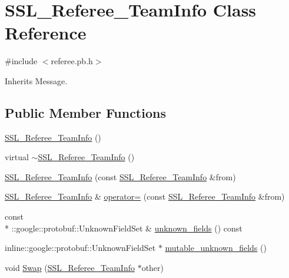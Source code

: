 \hypertarget{class_s_s_l___referee___team_info}{\section{S\-S\-L\-\_\-\-Referee\-\_\-\-Team\-Info Class Reference}
\label{class_s_s_l___referee___team_info}
}


{\ttfamily \#include $<$referee.\-pb.\-h$>$}



Inherits Message.

\subsection*{Public Member Functions}
\begin{DoxyCompactItemize}
\item 
\hyperlink{class_s_s_l___referee___team_info_a0565dabde6097b6615778a794f0bf9dc}{S\-S\-L\-\_\-\-Referee\-\_\-\-Team\-Info} ()
\item 
virtual \hyperlink{class_s_s_l___referee___team_info_aeba1dfe49338271acd685f88851bd9ff}{$\sim$\-S\-S\-L\-\_\-\-Referee\-\_\-\-Team\-Info} ()
\item 
\hyperlink{class_s_s_l___referee___team_info_aaf4eafc36c85daefadde77056064ced8}{S\-S\-L\-\_\-\-Referee\-\_\-\-Team\-Info} (const \hyperlink{class_s_s_l___referee___team_info}{S\-S\-L\-\_\-\-Referee\-\_\-\-Team\-Info} \&from)
\item 
\hyperlink{class_s_s_l___referee___team_info}{S\-S\-L\-\_\-\-Referee\-\_\-\-Team\-Info} \& \hyperlink{class_s_s_l___referee___team_info_a0b75e36f2ab5587f8d988d4547cf42d2}{operator=} (const \hyperlink{class_s_s_l___referee___team_info}{S\-S\-L\-\_\-\-Referee\-\_\-\-Team\-Info} \&from)
\item 
const \\*
\-::google\-::protobuf\-::\-Unknown\-Field\-Set \& \hyperlink{class_s_s_l___referee___team_info_a3b3a1180e7eca05d5b0fde307b132552}{unknown\-\_\-fields} () const 
\item 
inline\-::google\-::protobuf\-::\-Unknown\-Field\-Set $\ast$ \hyperlink{class_s_s_l___referee___team_info_a4502cbbd0055b7c63a77e6092dcd2f02}{mutable\-\_\-unknown\-\_\-fields} ()
\item 
void \hyperlink{class_s_s_l___referee___team_info_a7fff9e78070dba3e63ffd7b27395c80c}{Swap} (\hyperlink{class_s_s_l___referee___team_info}{S\-S\-L\-\_\-\-Referee\-\_\-\-Team\-Info} $\ast$other)
\item 

\end{DoxyCompactItemize}
